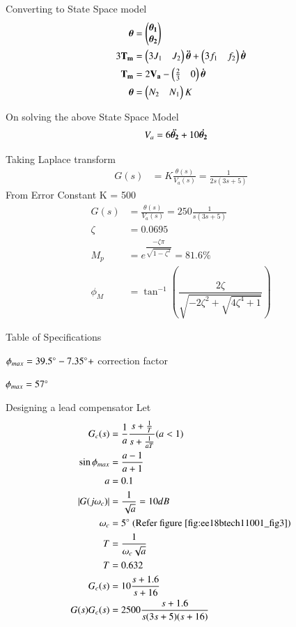 Converting to State Space model
\begin{align}
    \bm{\theta} &= \myvec{\bm{\theta_{1}} \\ \bm{\theta_{2}}}
    \\
    3 \Vec{T_{m}} &= \myvec{3J_{1} & J_{2}}\bm{\Ddot{\theta}}+ \myvec{3f_{1} & f_{2}}\bm{\dot{\theta}}
    \\
    \Vec{T_{m}} &= 2\vec{V_{a}} - \myvec{\frac{2}{3} & 0}\bm{\dot{\theta}}
    \\
    \bm{\theta} &= \myvec{N_{2} & N_{1}} K
\end{align}


On solving the above State Space Model
\begin{align}
    V_{a} &= 6\bm{\Ddot{\theta_{2}}} + 10\bm{\Dot{\theta_{2}}} \label{eq:ee18btech11001_6}
\end{align}

Taking Laplace transform
\begin{align}
   G(s) &=  K \frac{\theta (s)}{V_{a}(s)} = \frac{1}{2s(3s+5)} \label{eq:ee18btech11001_7}
\end{align}
From Error Constant  K = 500
\begin{align}
   G(s) &=  \frac{\theta (s)}{V_{a}(s)} = 250 \frac{1}{s(3s+5)} \label{eq:ee18btech11001_8}
   \\
   \zeta &= 0.0695
   \\
   M_{p} &= e^{\dfrac{-\zeta\pi}{\sqrt{1-\zeta^{2}}}} = 81.6\%
   \\
   \phi_{M} &= \tan^{-1}(\dfrac{2\zeta}{\sqrt{-2\zeta^2 + \sqrt{4\zeta^4 + 1}}})
\end{align}

\begin{table}[!ht]
\centering

\caption{Table of Specifications}
\label{table:ee18btech11001}
\end{table}

$\phi_{max} = 39.5\degree-7.35\degree+$ correction factor

$\phi_{max} = 57\degree$

Designing a lead compensator
Let 
\begin{align}
   G_{c}(s) &=  \frac{1}{a}\frac{s + \frac{1}{T}}{s + \frac{1}{aT}} (a<1) \label{eq:ee18btech11001_9}
   \\
   \sin\phi_{max} &= \dfrac{a-1}{a+1}
   \\
   a &= 0.1
   \\
   |G(j\omega_{c})| &= \frac{1}{\sqrt{a}} = 10 dB
   \\
   \omega_{c} &= 5\degree \text{  (Refer figure \ref{fig:ee18btech11001_fig3})}
   \\
   T &= \frac{1}{\omega_{c}\sqrt{a}}
   \\
   T &= 0.632
   \\
   G_{c}(s) &=  10 \frac{s + 1.6}{s + 16}
   \\
   G(s)G_{c}(s)  &= 2500 \dfrac{s+1.6}{s(3s+5)(s+16)} \label{eq:ee18btech11001_10}
\end{align}

